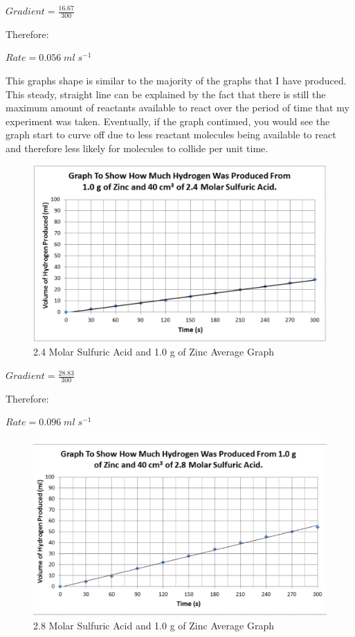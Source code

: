 $Gradient = \frac{16.67}{300}$

Therefore:

$Rate = 0.056 \; ml \; s^{-1}$

This graphs shape is similar to the majority of the graphs that I have produced. This steady, straight line can be explained by the fact that there is still the maximum amount of reactants available to react over the period of time that my experiment was taken. Eventually, if the graph continued, you would see the graph start to curve off due to less reactant molecules being available to react and therefore less likely for molecules to collide per unit time.

\begin{figure}[H]
    \includegraphics[width=\textwidth]{./Analysis/Images/1NonCatalyst/24Molar.pdf}
    \caption{2.4 Molar Sulfuric Acid and 1.0 g of Zinc Average Graph} \label{fig:24MolarSAGradient}
\end{figure}

$Gradient = \frac{28.83}{300}$

Therefore:

$Rate = 0.096 \; ml \; s^{-1}$

\begin{figure}[H]
    \includegraphics[width=\textwidth]{./Analysis/Images/1NonCatalyst/28Molar.pdf}
    \caption{2.8 Molar Sulfuric Acid and 1.0 g of Zinc Average Graph} \label{fig:28MolarSAGradient}
\end{figure}

